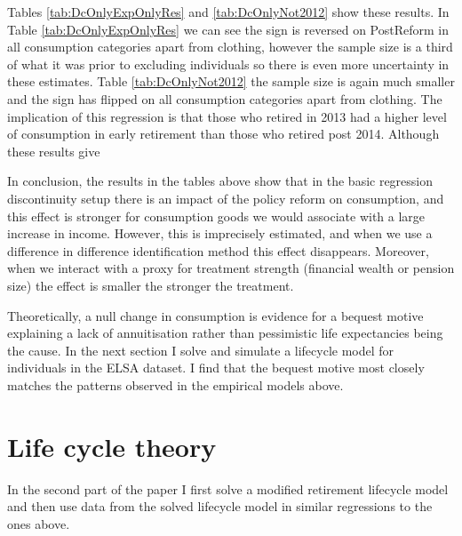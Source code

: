 \documentclass[12pt]{article}
\begin{document}
\begin{landscape}
    \linespread{1}
    
\end{landscape}

\begin{landscape}
    \linespread{1}
    
\end{landscape}

Tables \ref{tab:DcOnlyExpOnlyRes} and \ref{tab:DcOnlyNot2012} show these
results. In Table \ref{tab:DcOnlyExpOnlyRes} we can see the sign is reversed on
PostReform in all consumption categories apart from clothing, however the sample size is a third of what it
was prior to excluding individuals so there is even more uncertainty in these
estimates. Table \ref{tab:DcOnlyNot2012} the sample size is again much smaller
and the sign has flipped on all consumption categories apart from clothing. The
implication of this regression is that those who retired in 2013 had a higher
level of consumption in early retirement than those who retired post 2014.
Although these results give


In conclusion, the results in the tables above show that in the basic regression
discontinuity setup there is an impact of the policy reform on consumption, and
this effect is stronger for consumption goods we would associate with a large
increase in income. However, this is imprecisely estimated, and when we use a
difference in difference identification method this effect disappears. Moreover,
when we interact with a proxy for treatment strength (financial wealth or
pension size) the effect is smaller the stronger the treatment.

Theoretically, a null change in consumption is evidence for a bequest motive
explaining a lack of annuitisation rather than pessimistic life expectancies
being the cause. In the next section I solve and simulate a lifecycle model for
individuals in the ELSA dataset. I find that the bequest motive most closely
matches the patterns observed in the empirical models above.

\section{Life cycle theory}

In the second part of the paper I first solve a modified retirement lifecycle
model and then use data from the solved lifecycle model in similar regressions
to the ones above.
\end{document}
